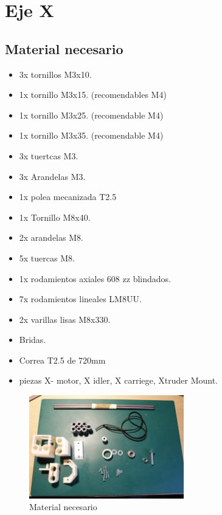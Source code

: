 \section{Eje X}
	\subsection{Material necesario}
		\begin{itemize}
			\item 3x tornillos M3x10.
			\item 1x tornillo M3x15. (recomendables M4)
			\item 1x tornillo M3x25. (recomendable M4)
			\item 1x tornillo M3x35. (recomendable M4)
			\item 3x tuertcas M3.
			\item 3x Arandelas M3.
			\item 1x polea mecanizada T2.5
			\item 1x Tornillo M8x40.
			\item 2x arandelas M8.
			\item 5x tuercas M8.
			\item 1x rodamientos axiales 608 zz blindados.
			\item 7x rodamientos lineales LM8UU.
			\item 2x varillas lisas M8x330.
			\item Bridas.
			\item Correa T2.5 de 720mm
			\item piezas X- motor, X idler, X carriege, Xtruder Mount.
		\end{itemize}
		\begin{figure}[!htp]
			\centering
			\includegraphics[width=0.6\textwidth]{../../Fotos/46.jpg}
			\caption{Material necesario}
		\end{figure}
		\newpage{}
